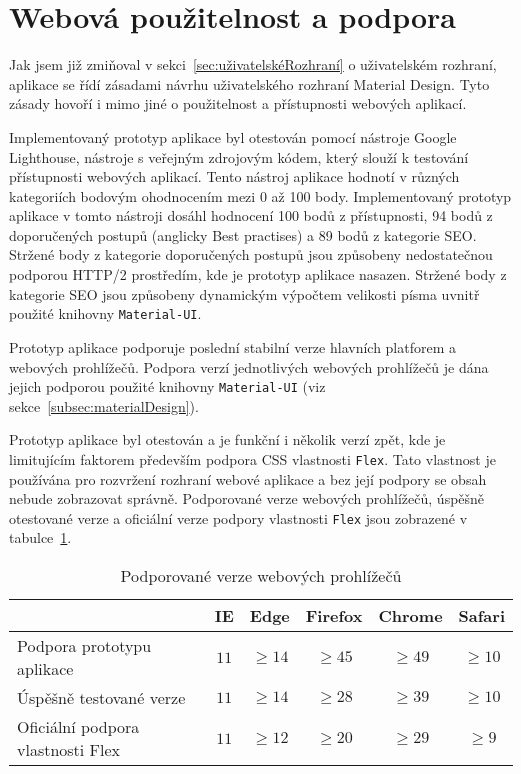 
\section{Webová použitelnost a podpora}\label{sec:webováPoužitelnostAPodpora}

Jak jsem již zmiňoval v sekci~\ref{sec:uživatelskéRozhraní} o uživatelském rozhraní, aplikace se řídí zásadami návrhu uživatelského rozhraní Material Design.
Tyto zásady hovoří i mimo jiné o použitelnost a přístupnosti webových aplikací.

Implementovaný prototyp aplikace byl otestován pomocí nástroje Google Lighthouse, nástroje s veřejným zdrojovým kódem, který slouží k testování přístupnosti webových aplikací.
Tento nástroj aplikace hodnotí v různých kategoriích bodovým ohodnocením mezi 0 až 100 body.
Implementovaný prototyp aplikace v tomto nástroji dosáhl hodnocení 100 bodů z přístupnosti, 94 bodů z doporučených postupů (anglicky Best practises) a 89 bodů z kategorie \gls{SEO}.
Stržené body z kategorie doporučených postupů jsou způsobeny nedostatečnou podporou \gls{HTTP}/2 prostředím, kde je prototyp aplikace nasazen.
Stržené body z kategorie \gls{SEO} jsou způsobeny dynamickým výpočtem velikosti písma uvnitř použité knihovny \texttt{Material-UI}.

Prototyp aplikace podporuje poslední stabilní verze hlavních platforem a webových prohlížečů.
Podpora verzí jednotlivých webových prohlížečů je dána jejich podporou použité knihovny \texttt{Material-UI} (viz sekce~\ref{subsec:materialDesign}).

Prototyp aplikace byl otestován a je funkční i několik verzí zpět, kde je limitujícím faktorem především podpora \acrshort{CSS} vlastnosti \texttt{Flex}.
Tato vlastnost je používána pro rozvržení rozhraní webové aplikace a bez její podpory se obsah nebude zobrazovat správně.
Podporované verze webových prohlížečů, úspěšně otestované verze a oficiální verze podpory vlastnosti \texttt{Flex} jsou zobrazené v tabulce~\ref{tab:verzeProhlížečů}.

\begin{table}[ht!]
    \centering
    \caption{Podporované verze webových prohlížečů}
    \label{tab:verzeProhlížečů}
    \begin{tabular}{l|ccccc}
        & IE & Edge & Firefox & Chrome & Safari \\ \hline
        Podpora prototypu aplikace & $11$ & $\geq 14$ & $\geq 45$ & $\geq 49$ & $\geq 10$ \\
        Úspěšně testované verze & $11$ & $\geq 14$ & $\geq 28$ & $\geq 39$ & $\geq 10$ \\
        Oficiální podpora vlastnosti Flex & $11$ & $\geq 12$ & $\geq 20$ & $\geq 29$ & $\geq 9$
    \end{tabular}
\end{table}
